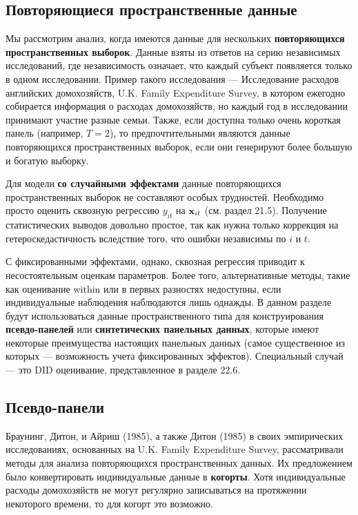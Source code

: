 \subsection{Повторяющиеся пространственные данные}

Мы рассмотрим анализ, когда имеются данные для нескольких \textbf{повторяющихся пространственных выборок}. Данные взяты из ответов на серию независимых исследований, где независимость означает, что каждый субъект появляется только в одном исследовании. Пример такого исследования --- Исследование расходов английских домохозяйств, U.K. Family Expenditure Survey, в котором ежегодно собирается информация о расходах домохозяйств, но каждый год в исследовании принимают участие разные семьи. Также, если доступна только очень короткая панель (например, $T=2$), то  предпочтительными являются данные повторяющихся пространственных выборок, если они генерируют более большую и богатую выборку.

Для модели \textbf{со случайными эффектами} данные повторяющихся пространственных выборок не составляют особых трудностей. Необходимо просто оценить сквозную регрессию $y_{it}$  на $\mathbf{x}_{it}$ (см. раздел 21.5). Получение статистических выводов довольно простое, так как нужна только коррекция на гетероскедастичность вследствие того, что ошибки независимы по $i$ и $t$.

С фиксированными эффектами, однако, сквозная регрессия приводит к несостоятельным оценкам параметров. Более того, альтернативные методы, такие как оценивание within или в первых разностях недоступны, если индивидуальные наблюдения наблюдаются лишь однажды. В данном разделе будут использоваться данные пространственного типа для конструирования \textbf{псевдо-панелей} или \textbf{синтетических панельных данных}, которые имеют некоторые преимущества настоящих панельных данных (самое существенное из которых --- возможность учета фиксированных эффектов). Специальный случай --- это DID оценивание, представленное в разделе 22.6.

\subsection{Псевдо-панели}

Браунинг, Дитон, и Айриш (1985), а также Дитон (1985) в своих эмпирических исследованиях, основанных на U.K. Family Expenditure Survey, рассматривали методы для анализа повторяющихся пространственных данных. Их предложением было конвертировать индивидуальные данные в \textbf{когорты}. Хотя индивидуальные расходы домохозяйств не могут регулярно записываться на протяжении некоторого времени, то для когорт это возможно.

